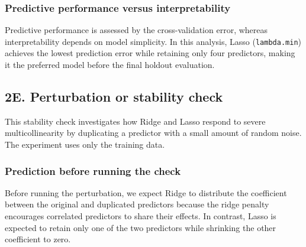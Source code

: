\documentclass[
  11pt,
]{article}
\begin{document}
\subsubsection{Predictive performance versus
interpretability}\label{predictive-performance-versus-interpretability}

Predictive performance is assessed by the cross-validation error,
whereas interpretability depends on model simplicity. In this analysis,
Lasso (\texttt{lambda.min}) achieves the lowest prediction error while
retaining only four predictors, making it the preferred model before the
final holdout evaluation.

\subsection{2E. Perturbation or stability
check}\label{e.-perturbation-or-stability-check}

This stability check investigates how Ridge and Lasso respond to severe
multicollinearity by duplicating a predictor with a small amount of
random noise. The experiment uses only the training data.

\subsubsection{Prediction before running the
check}\label{prediction-before-running-the-check}

Before running the perturbation, we expect Ridge to distribute the
coefficient between the original and duplicated predictors because the
ridge penalty encourages correlated predictors to share their effects.
In contrast, Lasso is expected to retain only one of the two predictors
while shrinking the other coefficient to zero.
\end{document}
